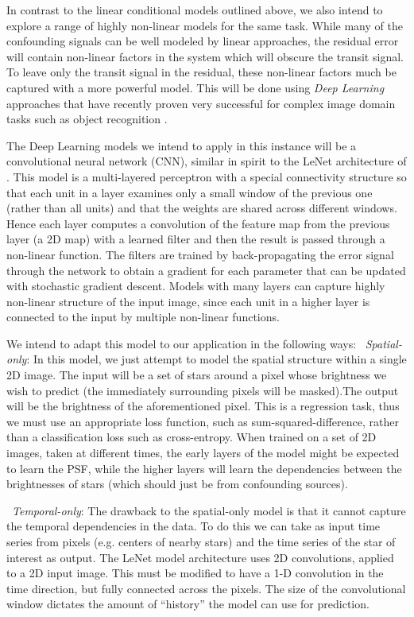 \documentclass[letterpaper,12pt,whitepaper]{haastex}
\newcounter{inlineitem}
\newcommand{\inlineitem}{\refstepcounter{inlineitem}{\textsl{(\theinlineitem)}}}
\begin{document}
In contrast to the linear conditional models outlined above, we also
intend to explore a range of highly non-linear models for the same
task. While many of the confounding signals can be well modeled by
linear approaches, the residual error will contain non-linear
factors in the system which will obscure the transit signal. To leave
only the transit signal in the residual, these non-linear factors much
be captured with a more powerful model. This will be done using \emph{Deep
Learning} approaches that have recently proven very successful for
complex image domain tasks such as object recognition \citep{Kriz12}.

The Deep Learning models we intend to apply in this instance will be a
convolutional neural network (CNN), similar in spirit to the LeNet
architecture of \citet{LeCun1998}. This model is a
multi-layered perceptron with a special connectivity structure so that
each unit in a layer examines only a small window of the previous one
(rather than all units) and that the weights are shared across
different windows. Hence each layer computes a convolution of the
feature map from the previous layer (a 2D map) with a learned filter
and then the result is passed through a non-linear function. The
filters are trained by back-propagating the error signal through the
network to obtain a gradient for each parameter that can be updated
with stochastic gradient descent. Models with many layers can capture
highly non-linear structure of the input image, since each unit in a
higher layer is connected to the input by multiple non-linear
functions.

We intend to adapt this model to our application in the following ways:
\setcounter{inlineitem}{0}\inlineitem~\emph{Spatial-only}: In this model, we just attempt to model the spatial
structure within a single 2D image. The input will be a set of stars
around a pixel whose brightness we wish to predict (the immediately
surrounding pixels will be masked).The output will be the brightness
of the aforementioned pixel. This is a regression task, thus we must
use an appropriate loss function, such as sum-squared-difference,
rather than a classification loss such as cross-entropy. When trained
on a set of 2D images, taken at different times, the early layers of
the model might be expected to learn the PSF, while the higher layers
will learn the dependencies between the brightnesses of stars (which
should just be from confounding sources).

\inlineitem~\emph{Temporal-only}: The drawback to the spatial-only model is that it
cannot capture the temporal dependencies in the data. To do this we
can take as input time series from pixels (e.g. centers of nearby
stars) and the time series of the star of interest as output. The
LeNet model architecture uses 2D convolutions, applied to a 2D input
image. This must be modified to have a 1-D convolution in the time
direction, but fully connected across the pixels. The size of the
convolutional window dictates the amount of ``history'' the model can
use for prediction.
\end{document}
